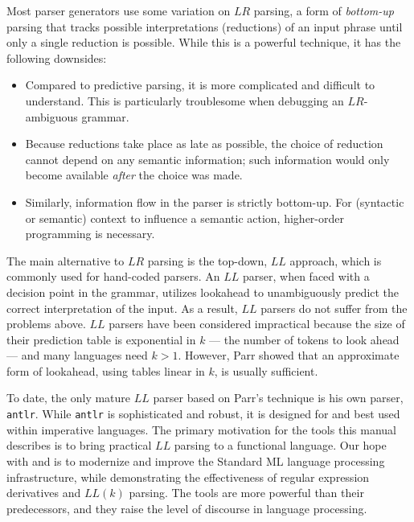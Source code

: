 Most parser generators use some variation on $LR$ parsing, a form of \emph{bottom-up} parsing that tracks possible interpretations (reductions) of an input phrase until only a single reduction is possible.  While this is a powerful technique, it has the following downsides:
\begin{itemize}
  \item Compared to predictive parsing, it is more complicated and difficult to understand.  This is particularly troublesome when debugging an $LR$-ambiguous grammar.
  \item Because reductions take place as late as possible, the choice of reduction cannot depend on any semantic information; such information would only become available \emph{after} the choice was made.
  \item Similarly, information flow in the parser is strictly bottom-up.  For (syntactic or semantic) context to influence a semantic action, higher-order programming is necessary.
\end{itemize}
The main alternative to $LR$ parsing is the top-down, $LL$ approach, which is commonly used for hand-coded parsers.  An $LL$ parser, when faced with a decision point in the grammar, utilizes lookahead to unambiguously predict the correct interpretation of the input.  As a result, $LL$ parsers do not suffer from the problems above.  $LL$ parsers have been considered impractical because the size of their prediction table is exponential in $k$ --- the number of tokens to look ahead --- and many languages need $k > 1$.  However, Parr showed that an approximate form of lookahead, using tables linear in $k$, is usually sufficient.

To date, the only mature $LL$ parser based on Parr's technique is his own parser, {\tt antlr}.  While {\tt antlr} is sophisticated and robust, it is designed for and best used within imperative languages.  The primary motivation for the tools this manual describes is to bring practical $LL$ parsing to a functional language.
Our hope with \ulex{} and \mlantlr{} is to modernize and improve the Standard ML language processing infrastructure, while demonstrating the effectiveness of regular expression derivatives and $LL(k)$ parsing.  The tools are more powerful than their predecessors, and they raise the level of discourse in language processing.


